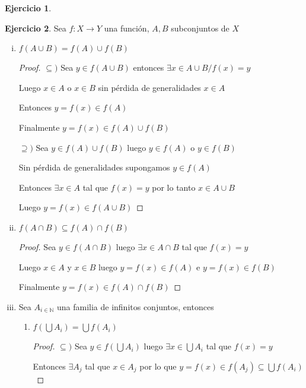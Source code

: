 \documentclass[12pt]{article}
\newcommand{\N}{\mathbb{N}}
\newcommand{\ra}{\rightarrow}
\theoremstyle{definition}
\newtheorem{ej}{Ejercicio}
\begin{document}
\begin{ej}
	
\end{ej}








\begin{ej}
Sea $f : X \ra Y$ una función, $A, B $ subconjuntos de $X$
\begin{enumerate}[i.]
  \item $f(A \cup B) = f(A) \cup f(B)$
    \begin{proof}
    $\subseteq )$ Sea $y \in f(A \cup B)$ entonces $\exists x \in A \cup B /  f(x) = y$ 

    Luego $x \in A$ o $ x \in B$ sin pérdida de generalidades $x \in A$ 

    Entonces  $ y = f(x) \in f(A)$

    Finalmente $y = f(x) \in f(A) \cup f(B)$ 

    $\supseteq )$ Sea $y \in f(A) \cup f(B)$ luego $y \in f(A)$ o $y \in f(B)$

    Sin pérdida de generalidades supongamos $y \in f(A)$

    Entonces $\exists x \in A  $ tal que $ f(x) = y $ por lo tanto $ x \in A \cup B$

    Luego $y = f(x) \in f(A \cup B)$
    
    \end{proof}
  \item $f(A \cap B) \subseteq f(A) \cap f(B)$
    \begin{proof}
    
    Sea $ y \in f(A \cap B)$ luego $\exists x \in A \cap B$ tal que $f(x) = y$

    Luego $x \in A $ y $x \in B$ luego $y = f(x) \in f(A)$ e $y = f(x) \in f(B)$

    Finalmente $y = f(x) \in f(A) \cap f(B)$ 
    
    \end{proof}
  \item Sea $A_{i \in \N} $ una familia de infinitos conjuntos, entonces 
    \begin{enumerate}
      \item $f(\bigcup A_{i}) = \bigcup f(A_{i})$ 
	\begin{proof} $\subseteq )$ Sea $y \in f(\bigcup A_{i})$ luego $\exists x \in \bigcup A_{i}$ tal que $f(x) = y$

	Entonces $\exists A_{j}$ tal que $x \in A_{j}$ por lo que $y = f(x) \in f(A_{j}) \subseteq \bigcup f(A_{i})$


\end{proof}
\end{enumerate}
\end{enumerate}
\end{ej}
\end{document}
